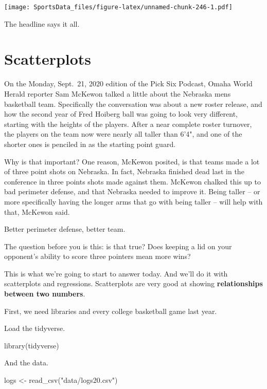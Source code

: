 \documentclass[
]{book}
\newenvironment{Shaded}{\begin{snugshade}}{\end{snugshade}}
\newcommand{\FunctionTok}[1]{\textcolor[rgb]{0.00,0.00,0.00}{#1}}
\newcommand{\NormalTok}[1]{#1}
\newcommand{\OtherTok}[1]{\textcolor[rgb]{0.56,0.35,0.01}{#1}}
\newcommand{\StringTok}[1]{\textcolor[rgb]{0.31,0.60,0.02}{#1}}
\begin{document}
\texttt{[image: SportsData\_files/figure-latex/unnamed-chunk-246-1.pdf]}

The headline says it all.

\hypertarget{scatterplots}{%
\chapter{Scatterplots}\label{scatterplots}}

On the Monday, Sept.~21, 2020 edition of the Pick Six Podcast, Omaha World Herald reporter Sam McKewon talked a little about the Nebraska mens basketball team. Specifically the conversation was about a new roster release, and how the second year of Fred Hoiberg ball was going to look very different, starting with the heights of the players. After a near complete roster turnover, the players on the team now were nearly all taller than 6'4", and one of the shorter ones is penciled in as the starting point guard.

Why is that important? One reason, McKewon posited, is that teams made a lot of three point shots on Nebraska. In fact, Nebraska finished dead last in the conference in three points shots made against them. McKewon chalked this up to bad perimeter defense, and that Nebraska needed to improve it. Being taller -- or more specifically having the longer arms that go with being taller -- will help with that, McKewon said.

Better perimeter defense, better team.

The question before you is this: is that true? Does keeping a lid on your opponent's ability to score three pointers mean more wins?

This is what we're going to start to answer today. And we'll do it with scatterplots and regressions. Scatterplots are very good at showing \textbf{relationships between two numbers}.

First, we need libraries and every college basketball game last year.

Load the tidyverse.

\begin{Shaded}
\begin{Highlighting}[]
\FunctionTok{library}\NormalTok{(tidyverse)}
\end{Highlighting}
\end{Shaded}

And the data.

\begin{Shaded}
\begin{Highlighting}[]
\NormalTok{logs }\OtherTok{\textless{}{-}} \FunctionTok{read\_csv}\NormalTok{(}\StringTok{"data/logs20.csv"}\NormalTok{)}
\end{Highlighting}
\end{Shaded}
\end{document}
